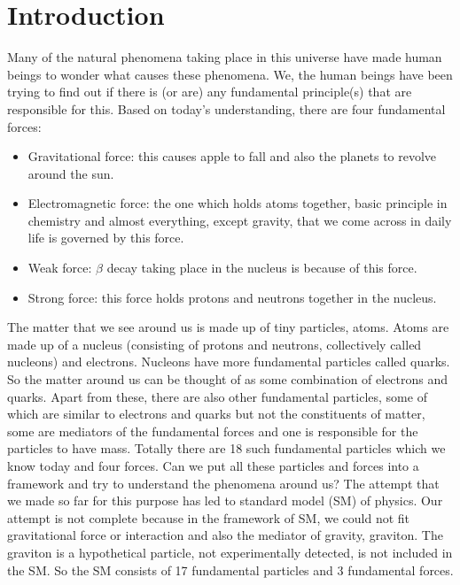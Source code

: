 
\chapter{Introduction} %

\label{Chap1} %


\newcommand{\keyword}[1]{\textbf{#1}}
\newcommand{\tabhead}[1]{\textbf{#1}}
\newcommand{\code}[1]{\texttt{#1}}
\newcommand{\file}[1]{\texttt{\bfseries#1}}
\newcommand{\option}[1]{\texttt{\itshape#1}}

Many of the natural phenomena taking place in this universe have made human beings to wonder what causes these phenomena. We, the human beings have been trying to find out if there is (or are) any fundamental principle(s) that are responsible for this. Based on today's understanding, there are four fundamental forces:
\begin{itemize}
\item Gravitational force: this causes apple to fall and also the planets to revolve around the sun.
\item Electromagnetic force: the one which holds atoms together, basic principle in chemistry and almost everything, except gravity, that we come across in daily life is governed by this force.
\item Weak force: $\beta$ decay taking place in the nucleus is because of this force.
\item Strong force: this force holds protons and neutrons together in the nucleus.
\end{itemize}
The matter that we see around us is made up of tiny particles, atoms. Atoms are made up of a nucleus (consisting of protons and neutrons, collectively called nucleons) and electrons. Nucleons have more fundamental particles called quarks. So the matter around us can be thought of as some combination of electrons and quarks. Apart from these, there are also other fundamental particles, some of which are similar to electrons and quarks but not the constituents of matter, some are mediators of the fundamental forces and one is responsible for the particles to have mass. Totally there are 18 such fundamental particles which we know today and four forces. Can we put all these particles and forces into a framework and try to understand the phenomena around us? The attempt that we made so far for this purpose has led to standard model (SM) of physics. Our attempt is not complete because in the framework of SM, we could not fit gravitational force or interaction and also the mediator of gravity, graviton. The graviton is a hypothetical particle, not experimentally detected, is not included in the SM. So the SM consists of 17 fundamental particles and 3 fundamental forces.

